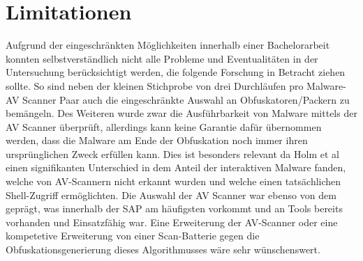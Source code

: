 \section{Limitationen}
Aufgrund der eingeschränkten Möglichkeiten innerhalb einer Bachelorarbeit konnten selbstverständlich nicht alle Probleme und Eventualitäten in der Untersuchung berücksichtigt werden, die folgende Forschung in Betracht ziehen sollte.
So sind neben der kleinen Stichprobe von drei Durchläufen pro Malware-AV Scanner Paar auch die eingeschränkte Auswahl an Obfuskatoren/Packern zu bemängeln. Des Weiteren wurde zwar die Ausführbarkeit von Malware mittels der AV Scanner überprüft, allerdings kann keine Garantie dafür übernommen werden, dass die Malware am Ende der Obfuskation noch immer ihren ursprünglichen Zweck erfüllen kann. Dies ist besonders relevant da Holm et al \cite{holm_2023_hide} einen signifikanten Unterschied in dem Anteil der interaktiven Malware fanden, welche von AV-Scannern nicht erkannt wurden und welche einen tatsächlichen Shell-Zugriff ermöglichten.
Die Auswahl der AV Scanner war ebenso von dem geprägt, was innerhalb der SAP am häufigsten vorkommt und an Tools bereits vorhanden und Einsatzfähig war. Eine Erweiterung der AV-Scanner oder eine kompetetive Erweiterung von einer Scan-Batterie gegen die Obfuskationsgenerierung dieses Algorithmusses wäre sehr wünschenswert.